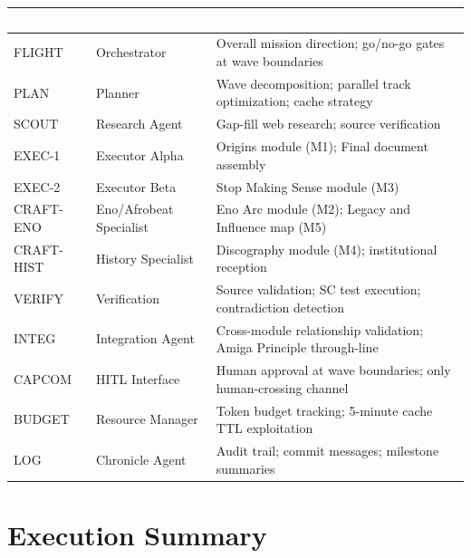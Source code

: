\documentclass[11pt,letterpaper]{article}
\newcommand{\tableheader}[1]{\textbf{\sffamily\textcolor{white}{#1}}}
\begin{document}
\begin{center}
\begin{tabularx}{\textwidth}{L{2cm}L{2.5cm}X}
\toprule
{}
\tableheader{Role} & \tableheader{Agent} & \tableheader{Responsibility} \\
\midrule
FLIGHT & Orchestrator & Overall mission direction; go/no-go gates at wave boundaries \\
PLAN & Planner & Wave decomposition; parallel track optimization; cache strategy \\
SCOUT & Research Agent & Gap-fill web research; source verification \\
EXEC-1 & Executor Alpha & Origins module (M1); Final document assembly \\
EXEC-2 & Executor Beta & Stop Making Sense module (M3) \\
CRAFT-ENO & Eno/Afrobeat Specialist & Eno Arc module (M2); Legacy and Influence map (M5) \\
CRAFT-HIST & History Specialist & Discography module (M4); institutional reception \\
VERIFY & Verification & Source validation; SC test execution; contradiction detection \\
INTEG & Integration Agent & Cross-module relationship validation; Amiga Principle through-line \\
CAPCOM & HITL Interface & Human approval at wave boundaries; only human-crossing channel \\
BUDGET & Resource Manager & Token budget tracking; 5-minute cache TTL exploitation \\
LOG & Chronicle Agent & Audit trail; commit messages; milestone summaries \\
\bottomrule
\end{tabularx}
\end{center}

\section{Execution Summary}
\end{document}
